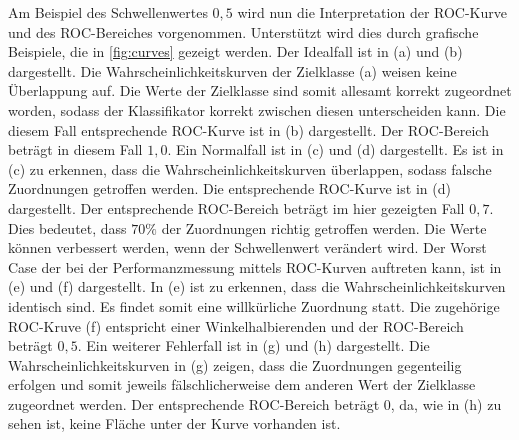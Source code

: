 Am Beispiel des Schwellenwertes $0,5$ wird nun die Interpretation der ROC-Kurve und des ROC-Bereiches vorgenommen. Unterstützt wird dies durch grafische Beispiele, die in \autoref{fig:curves} gezeigt werden. Der Idealfall ist in (a) und (b) dargestellt. Die Wahrscheinlichkeitskurven der Zielklasse (a) weisen keine Überlappung auf. Die Werte der Zielklasse sind somit allesamt korrekt zugeordnet worden, sodass der Klassifikator korrekt zwischen diesen unterscheiden kann. Die diesem Fall entsprechende ROC-Kurve ist in (b) dargestellt. Der ROC-Bereich beträgt in diesem Fall $1,0$. Ein \glqq Normalfall\grqq{} ist in (c) und (d) dargestellt. Es ist in (c) zu erkennen, dass die Wahrscheinlichkeitskurven überlappen, sodass falsche Zuordnungen getroffen werden. Die entsprechende ROC-Kurve ist in (d) dargestellt. Der entsprechende ROC-Bereich beträgt im hier gezeigten Fall $0,7$. Dies bedeutet, dass $70\%$ der Zuordnungen richtig getroffen werden. Die Werte können verbessert werden, wenn der Schwellenwert verändert wird. Der \glqq Worst Case\grqq{} der bei der Performanzmessung mittels ROC-Kurven auftreten kann, ist in (e) und (f) dargestellt. In (e) ist zu erkennen, dass die Wahrscheinlichkeitskurven identisch sind. Es findet somit eine willkürliche Zuordnung statt. Die zugehörige ROC-Kruve (f) entspricht einer Winkelhalbierenden und der ROC-Bereich beträgt $0,5$. Ein weiterer Fehlerfall ist in (g) und (h) dargestellt. Die Wahrscheinlichkeitskurven in (g) zeigen, dass die Zuordnungen gegenteilig erfolgen und somit jeweils fälschlicherweise dem anderen Wert der Zielklasse zugeordnet werden. Der entsprechende ROC-Bereich beträgt $0$, da, wie in (h) zu sehen ist, keine Fläche unter der Kurve vorhanden ist.

